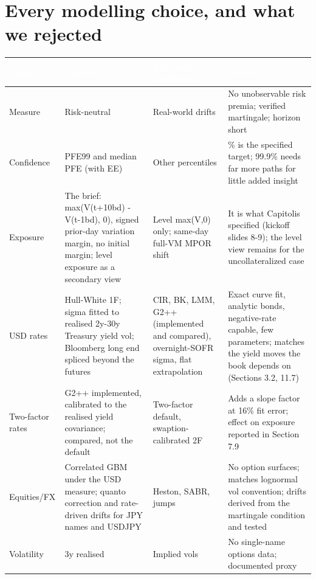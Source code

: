 \documentclass[11pt,letterpaper]{article}
\begin{document}
\section{Every modelling choice, and what we rejected}
{\scriptsize\setlength{\LTpre}{4pt}\setlength{\LTpost}{6pt}
\begin{longtable}{>{\raggedright\arraybackslash}p{}>{\raggedright\arraybackslash}p{}>{\raggedright\arraybackslash}p{}>{\raggedright\arraybackslash}p{}}
\toprule
\rowcolor{navy}\textbf{\textcolor{white}{Topic}} & \textbf{\textcolor{white}{Choice}} & \textbf{\textcolor{white}{Alternatives considered}} & \textbf{\textcolor{white}{Reason}} \\
\endhead
Measure & Risk-neutral & Real-world drifts & No unobservable risk premia; verified martingale; horizon short \\
\rowcolor{gray!9}Confidence & PFE99 and median PFE (with EE) & Other percentiles & 99\% is the specified target; 99.9\% needs far more paths for little added insight \\
Exposure & The brief: max(V(t+10bd) - V(t-1bd), 0), signed prior-day variation margin, no initial margin; level exposure as a secondary view & Level max(V,0) only; same-day full-VM MPOR shift & It is what Capitolis specified (kickoff slides 8-9); the level view remains for the uncollateralized case \\
\rowcolor{gray!9}USD rates & Hull-White 1F; sigma fitted to realised 2y-30y Treasury yield vol; Bloomberg long end spliced beyond the futures & CIR, BK, LMM, G2++ (implemented and compared), overnight-SOFR sigma, flat extrapolation & Exact curve fit, analytic bonds, negative-rate capable, few parameters; matches the yield moves the book depends on (Sections 3.2, 11.7) \\
Two-factor rates & G2++ implemented, calibrated to the realised yield covariance; compared, not the default & Two-factor default, swaption-calibrated 2F & Adds a slope factor at 16\% fit error; effect on exposure reported in Section 7.9 \\
\rowcolor{gray!9}Equities/FX & Correlated GBM under the USD measure; quanto correction and rate-driven drifts for JPY names and USDJPY & Heston, SABR, jumps & No option surfaces; matches lognormal vol convention; drifts derived from the martingale condition and tested \\
Volatility & 3y realised & Implied vols & No single-name options data; documented proxy \\

\end{longtable}}
\end{document}
